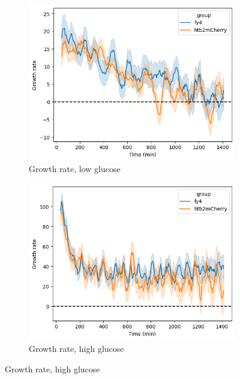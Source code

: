 \begin{figure}
  \centering
  \begin{subfigure}[htpb]{0.45\textwidth}
   \centering
   \includegraphics[width=\textwidth]{allstrains_31492_gr}
   \caption{
     Growth rate, low glucose
   }
   \label{fig:biology-lowglc-gr}
  \end{subfigure}%
  \begin{subfigure}[htpb]{0.45\textwidth}
   \centering
   \includegraphics[width=\textwidth]{allstrains_26643_gr}
   \caption{
     Growth rate, high glucose
   }
   \label{fig:biology-highglc-gr}
  \end{subfigure}


\end{figure}
